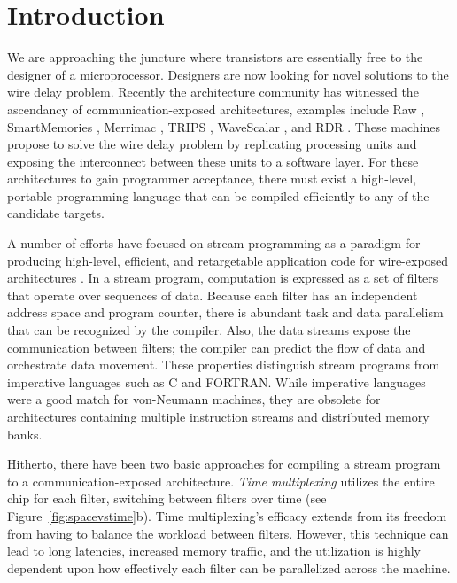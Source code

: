 \section{Introduction}

We are approaching the juncture where transistors are essentially free
to the designer of a microprocessor.  Designers are now looking for
novel solutions to the wire delay problem. Recently the architecture
community has witnessed the ascendancy of communication-exposed
architectures, examples include Raw \cite{raw}, SmartMemories
\cite{smartmemories}, Merrimac \cite{merrimac-sc03}, TRIPS
\cite{trips}, WaveScalar \cite{wavescalar}, and RDR \cite{rdr}.  These
machines propose to solve the wire delay problem by replicating
processing units and exposing the interconnect between these units to
a software layer.  For these architectures to gain programmer
acceptance, there must exist a high-level, portable programming
language that can be compiled efficiently to any of the candidate
targets.

A number of efforts have focused on stream programming as a paradigm
for producing high-level, efficient, and retargetable application code
for wire-exposed architectures \cite{streamit-asplos,imagine-ieee,merrimac-sc03,trips-isca03}.
In a stream program, computation is expressed as a set of filters that
operate over sequences of data.  Because each filter has an
independent address space and program counter, there is abundant task
and data parallelism that can be recognized by the compiler.  Also,
the data streams expose the communication between filters; the
compiler can predict the flow of data and orchestrate data movement.
These properties distinguish stream programs from imperative languages
such as C and FORTRAN.  While imperative languages were a good match
for von-Neumann machines, they are obsolete for architectures
containing multiple instruction streams and distributed memory banks.

Hitherto, there have been two basic approaches for compiling a stream
program to a communication-exposed architecture.  {\it Time
multiplexing} utilizes the entire chip for each filter, switching
between filters over time (see Figure~\ref{fig:spacevstime}b).  Time
multiplexing's efficacy extends from its freedom from having to
balance the workload between filters.  However, this technique can
lead to long latencies, increased memory traffic, and the utilization
is highly dependent upon how effectively each filter can be
parallelized across the machine.

